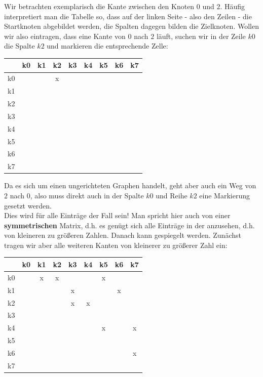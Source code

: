 \documentclass{article}
\begin{document}
Wir betrachten exemplarisch die Kante zwischen den Knoten $0$ und $2$. Häufig interpretiert man die Tabelle so, dass auf der linken Seite - also den Zeilen -  die Startknoten abgebildet werden, die Spalten dagegen bilden die Zielknoten. Wollen wir also eintragen, dass eine Kante von $0$ nach $2$ läuft, suchen wir in der Zeile $k0$ die Spalte $k2$ und markieren die entsprechende Zelle: 
\begin{center}
    \begin{tabular}{|c|c|c|c|c|c|c|c|c|}
        \hline 
            & k0 & k1 & k2 & k3 & k4 & k5 & k6 & k7  \\
        \hline 
        k0 & & & \color{red} x \color{black}& & & & & \\
        \hline 
        k1 & & & & & & & &\\
        \hline 
        k2 & & & & & & & &\\
        \hline 
        k3 & & & & & & & &\\
        \hline 
        k4 & & & & & & & &\\
        \hline 
        k5 & & & & & & & &\\
        \hline 
        k6 & & & & & & & &\\
        \hline 
        k7 & & & & & & & &\\
        \hline 
    \end{tabular} 
    \end{center}
Da es sich um einen ungerichteten Graphen handelt, geht aber auch ein Weg von $2$ nach $0$, also muss direkt auch in der Spalte $k0$ und Reihe $k2$ eine Markierung gesetzt werden. \\
Dies wird für alle Einträge der Fall sein! Man spricht hier auch von einer \textbf{symmetrischen} Matrix, d.h. es genügt sich alle Einträge in der  anzusehen, d.h. von kleineren zu größeren Zahlen. Danach kann  gespiegelt werden. Zunächst tragen wir aber alle weiteren Kanten von kleinerer zu größerer Zahl ein:
\begin{center}
    \begin{tabular}{|c|c|c|c|c|c|c|c|c|}
        \hline 
            & k0 & k1 & k2 & k3 & k4 & k5 & k6 & k7  \\
        \hline 
        k0 & & \color{red} x \color{black}& \color{red} x \color{black}& & & \color{red} x \color{black}& & \\
        \hline 
        k1 & & & &\color{red} x \color{black} & & & \color{red} x \color{black}&\\
        \hline 
        k2 & & & & \color{red} x \color{black}& \color{red} x \color{black}& & &\\
        \hline 
        k3 & & & & & & & &\\
        \hline 
        k4 & & & & & &\color{red} x \color{black} & & \color{red} x \color{black}\\
        \hline 
        k5 & & & & & & & &\\
        \hline 
        k6 & & & & & & & & \color{red} x \color{black}\\
        \hline 
        k7 & & & & & & & &\\
        \hline 
    \end{tabular} 
    \end{center}
\end{document}
